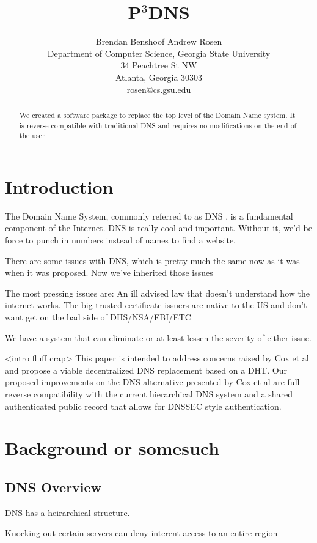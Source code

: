 \documentclass[11pt]{ieeetran} %
\title{P$^{3}$DNS}
\author{
Brendan Benshoof \qquad Andrew Rosen  \\Department of Computer Science, Georgia State University\\ 34 Peachtree St NW \\ Atlanta, Georgia 30303\\  rosen@cs.gsu.edu }
\begin{document}
\maketitle

\begin{abstract}
We created a software package to replace the top level of the Domain Name system.  It is reverse compatible with traditional DNS and requires no modifications on the end of the user
\end{abstract}


\section{Introduction}


The Domain Name System, commonly referred to as DNS \cite{mockapetris2003rfc} \cite{mockapetris2004rfc}, is a fundamental component of the Internet.
DNS is really cool and important.  Without it, we'd be force to punch in numbers instead of names to find a website.    

There are some issues with DNS, which is pretty much the same now as it was when it was proposed.  Now we've inherited those issues

The most pressing issues are:
An ill advised law that doesn't understand how the internet works.
The big trusted certificate issuers are native to the US and don't want get on the bad side of DHS/NSA/FBI/ETC

We have a system that can eliminate or at least lessen the severity of either issue.

<intro fluff crap>
This paper is intended to address concerns raised by Cox et al\cite{cox} and propose a viable decentralized DNS replacement based on a DHT. Our proposed improvements on the DNS alternative presented by Cox et al are full reverse compatibility with the current hierarchical DNS system and a shared authenticated public record that allows for DNSSEC style authentication.

\section{Background or somesuch}

\subsection{DNS Overview}

DNS has a heirarchical structure.

Knocking out certain servers can deny interent access to an entire region
\end{document}
